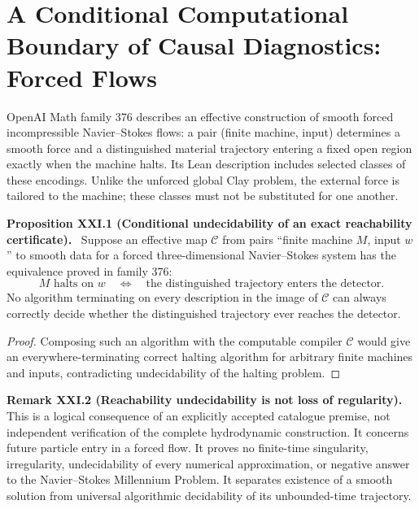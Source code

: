 \documentclass[11pt,a4paper,oneside]{book}
\newcommand{\statement}[3]{\par\medskip\noindent\textbf{#1 #2 (#3).}\ }
\begin{document}
\chapter{A Conditional Computational Boundary of Causal Diagnostics: Forced Flows}
OpenAI Math family 376 describes an effective construction of smooth forced incompressible Navier--Stokes flows: a pair (finite machine, input) determines a smooth force and a distinguished material trajectory entering a fixed open region exactly when the machine halts. Its Lean description includes selected classes of these encodings. Unlike the unforced global Clay problem, the external force is tailored to the machine; these classes must not be substituted for one another.
\statement{Proposition}{XXI.1}{Conditional undecidability of an exact reachability certificate} Suppose an effective map $\mathcal C$ from pairs ``finite machine $M$, input $w$'' to smooth data for a forced three-dimensional Navier--Stokes system has the equivalence proved in family 376:
\[M\text{ halts on }w\quad\Longleftrightarrow\quad\text{the distinguished trajectory enters the detector}.\]
No algorithm terminating on every description in the image of $\mathcal C$ can always correctly decide whether the distinguished trajectory ever reaches the detector.
\begin{proof}Composing such an algorithm with the computable compiler $\mathcal C$ would give an everywhere-terminating correct halting algorithm for arbitrary finite machines and inputs, contradicting undecidability of the halting problem.\end{proof}
\statement{Remark}{XXI.2}{Reachability undecidability is not loss of regularity} This is a logical consequence of an explicitly accepted catalogue premise, not independent verification of the complete hydrodynamic construction. It concerns future particle entry in a forced flow. It proves no finite-time singularity, irregularity, undecidability of every numerical approximation, or negative answer to the Navier--Stokes Millennium Problem. It separates existence of a smooth solution from universal algorithmic decidability of its unbounded-time trajectory.
\end{document}
